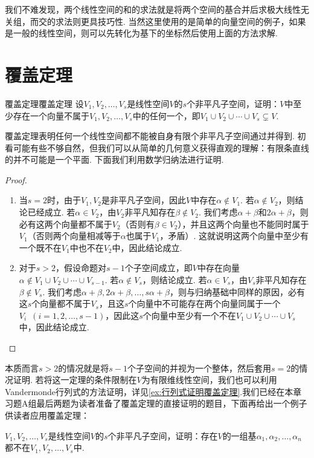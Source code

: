 我们不难发现，两个线性空间的和的求法就是将两个空间的基合并后求极大线性无关组，而交的求法则更具技巧性. 当然这里使用的是简单的向量空间的例子，如果是一般的线性空间，则可以先转化为基下的坐标然后使用上面的方法求解.

\section{覆盖定理}

\begin{theorem}{覆盖定理}{覆盖定理} 
    设$V_1,V_2,\ldots,V_s$是线性空间$V$的$s$个非平凡子空间，证明：$V$中至少存在一个向量不属于$V_1,V_2,\ldots,V_s$中的任何一个，即$V_1 \cup V_2 \cup \cdots \cup V_s\subsetneq V$.
\end{theorem}

覆盖定理表明任何一个线性空间都不能被自身有限个非平凡子空间通过并得到. 初看可能有些不够自然，但我们可以从简单的几何意义获得直观的理解：有限条直线的并不可能是一个平面. 下面我们利用数学归纳法进行证明.

\begin{proof}
    \begin{enumerate}
        \item 当$s=2$时，由于$V_1,V_2$是非平凡子空间，因此$V$中存在$\alpha\notin V_1$. 若$\alpha\notin V_2$，则结论已经成立. 若$\alpha\in V_2$，由$V_2$非平凡知存在$\beta\notin V_2$. 我们考虑$\alpha+\beta$和$2\alpha+\beta$，则必有这两个向量都不属于$V_2$（否则有$\beta\in V_2$），并且这两个向量也不能同时属于$V_1$（否则两个向量相减等于$\alpha$也属于$V_1$，矛盾）. 这就说明这两个向量中至少有一个既不在$V_1$中也不在$V_2$中，因此结论成立.

        \item 对于$s>2$，假设命题对$s-1$个子空间成立，即$V$中存在向量$\alpha\notin V_1\cup V_2\cup\cdots\cup V_{s-1}$. 若$\alpha\notin V_s$，则结论成立. 若$\alpha\in V_s$，由$V_s$非平凡知存在$\beta\notin V_s$. 我们考虑$\alpha+\beta,2\alpha+\beta,\ldots,s\alpha+\beta$，则与归纳基础中同样的原因，必有这$s$个向量都不属于$V_s$，且这$s$个向量中不可能存在两个向量同属于一个$V_i\enspace(i=1,2,\ldots,s-1)$，因此这$s$个向量中至少有一个不在$V_1\cup V_2\cup\cdots\cup V_s$中，因此结论成立.
    \end{enumerate}
\end{proof}

本质而言$s>2$的情况就是将$s-1$个子空间的并视为一个整体，然后套用$s=2$的情况证明. 若将这一定理的条件限制在$V$为有限维线性空间，我们也可以利用Vandermonde行列式的方法证明，详见\autoref{ex:行列式证明覆盖定理}.我们已经在本章习题A组最后两题为读者准备了覆盖定理的直接证明的题目，下面再给出一个例子供读者应用覆盖定理：
\begin{example}{}{}
    $V_1,V_2,\ldots,V_s$是线性空间$V$的$s$个非平凡子空间，证明：存在$V$的一组基$\alpha_1,\alpha_2,\ldots,\alpha_n$都不在$V_1,V_2,\ldots,V_s$中.
\end{example}

